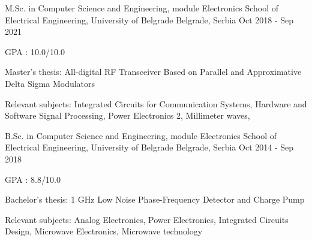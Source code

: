


\begin{cventries}


\cventry
{M.Sc. in Computer Science and Engineering, module Electronics} %
{School of Electrical Engineering, University of Belgrade} %
{Belgrade, Serbia} %
{Oct 2018 - Sep 2021} %
{ %
\begin{cvitems}
\item {GPA : \textcolor{awesome-red}{10.0}/10.0}
\item {Master's thesis: \textcolor{awesome-red}{All-digital RF Transceiver Based on Parallel and Approximative Delta Sigma Modulators}}
\item {Relevant subjects: Integrated Circuits for Communication Systems, Hardware and Software Signal Processing, Power Electronics 2, Millimeter waves,}
\end{cvitems} %
}

\cventry
{B.Sc. in Computer Science and Engineering, module Electronics} %
{School of Electrical Engineering, University of Belgrade} %
{Belgrade, Serbia} %
{Oct 2014 - Sep 2018} %
{ %
\begin{cvitems}
\item {GPA : \textcolor{awesome-red}{8.8}/10.0}
\item {Bachelor's thesis: \textcolor{awesome-red}{1 GHz Low Noise Phase-Frequency Detector and Charge Pump}}
\item {Relevant subjects: Analog Electronics, Power Electronics, Integrated Circuits Design, Microwave Electronics, Microwave technology }
\end{cvitems}
}


\end{cventries}